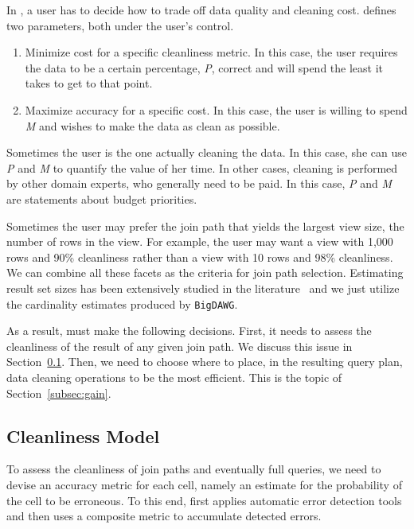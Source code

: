In \dcv, a user has to decide how to trade off data quality and cleaning cost. 
\dcv defines two parameters, both under the user's control.

\begin{enumerate}
\item Minimize cost for a specific cleanliness metric. In this case, the user requires the data to be a certain percentage, \emph{P}, correct and will spend the least it takes to get to that point.

\item Maximize accuracy for a specific cost. In this case, the user is willing to spend \emph{M} and wishes to make the data as clean as possible.
\end{enumerate}

Sometimes the user is the one actually cleaning the data. In this case, she can use \emph{P} and \emph{M} to quantify the value of her time. 
In other cases, cleaning is performed by other domain experts, who generally need to be paid. In this case, \emph{P} and \emph{M} are statements about budget priorities.

Sometimes the user may prefer the join path that yields the largest view size, \ie the number of rows in the view. 
For example, the user may want a view with 1,000 rows and 90\% cleanliness rather than a view with 10 rows and 98\% cleanliness. 
We can combine all these facets as the criteria for join path selection.
Estimating result set sizes has been extensively studied in the literature~\cite{DBLP:conf/sigmod/IoannidisP95} and we just utilize the cardinality estimates produced by \texttt{BigDAWG}.

As a result, \dcv must make the following decisions. 
First, it needs to assess the cleanliness of the result of any given join path. We discuss this issue in Section~\ref{subsec:model}. 
Then, we need to choose where to place, in the resulting query plan, data cleaning operations to be the most efficient. This is the topic of Section~\ref{subsec:gain}.


\subsection{Cleanliness Model}
\label{subsec:model}

To assess the cleanliness of join paths and eventually full queries, 
we need to devise an accuracy metric for each cell, namely an estimate for the probability of the cell to be erroneous. To this end, \dcv first applies automatic error detection tools and then uses a composite metric to accumulate detected errors. 

